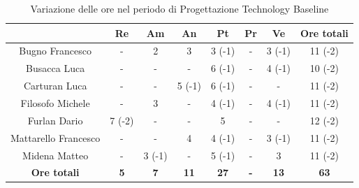 \begin{table}[H]
  \centering
  \renewcommand{\arraystretch}{1.8}
  \begin{tabular}{c|c|c|c|c|c|c|c}
    \rowcolor[HTML]{125E28}
    \multicolumn{1}{c}{\color[HTML]{FFFFFF}\textbf{ Nominativo }}
                         & \multicolumn{1}{c}{\color[HTML]{FFFFFF}\textbf{ Re }}
                         & \multicolumn{1}{c}{\color[HTML]{FFFFFF}\textbf{ Am}}
                         & \multicolumn{1}{c}{\color[HTML]{FFFFFF}\textbf{ An }}
                         & \multicolumn{1}{c}{\color[HTML]{FFFFFF}\textbf{ Pt }}
                         & \multicolumn{1}{c}{\color[HTML]{FFFFFF}\textbf{ Pr }}
                         & \multicolumn{1}{c}{\color[HTML]{FFFFFF}\textbf{ Ve }}
                         & \multicolumn{1}{c}{\color[HTML]{FFFFFF}\textbf{ Ore totali }}                                                                                   \\
    \hline
    Bugno Francesco      & -                                                             & 2          & 3           & 3 (-1)      & -          & 3 (-1)      & 11 (-2)     \\
    Busacca Luca         & -                                                             & -          & -           & 6 (-1)      & -          & 4 (-1)      & 10 (-2)     \\
    Carturan Luca        & -                                                             & -          & 5 (-1)      & 6 (-1)      & -          & -           & 11 (-2)     \\
    Filosofo Michele     & -                                                             & 3          & -           & 4 (-1)      & -          & 4 (-1)      & 11 (-2)     \\
    Furlan Dario         & 7 (-2)                                                        & -          & -           & 5           & -          & -           & 12 (-2)     \\
    Mattarello Francesco & -                                                             & -          & 4           & 4 (-1)      & -          & 3 (-1)      & 11 (-2)     \\
    Midena Matteo        & -                                                             & 3 (-1)     & -           & 5 (-1)      & -          & 3           & 11 (-2)     \\
    \textbf{Ore totali}  & \textbf{5}                                                    & \textbf{7} & \textbf{11} & \textbf{27} & \textbf{-} & \textbf{13} & \textbf{63}
  \end{tabular}
  \caption{Variazione delle ore nel periodo di Progettazione Technology Baseline}
\end{table}

